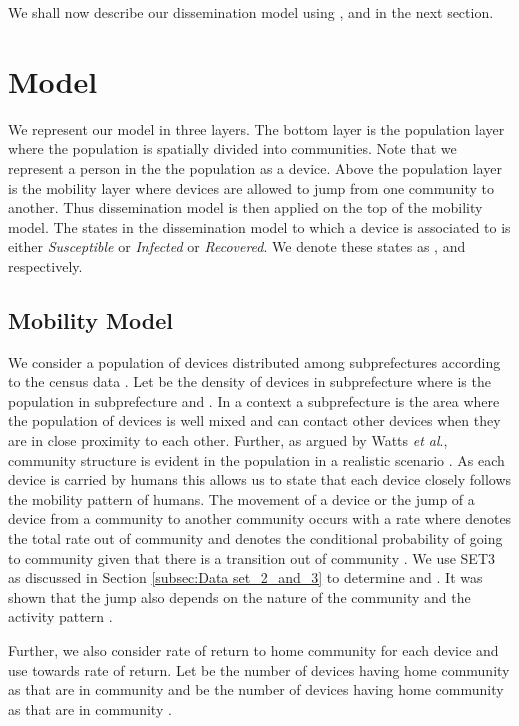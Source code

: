 \documentclass[review]{elsarticle}
\begin{document}
We shall now describe our dissemination model using ,  and  in the next section.

\section{Model}\label{sec:model}

We represent our model in three layers. The bottom layer is the population layer where the population is spatially divided into communities. Note that we represent a person in the the population as a device. Above the population layer is the mobility layer where devices are allowed to jump from one community to another. Thus dissemination model is then applied on the top of the mobility model. The states in the dissemination model to which a device is associated to is either \emph{Susceptible} or \emph{Infected} or \emph{Recovered}. We denote these states as ,  and  respectively.


\subsection{Mobility Model}\label{subsec:C3_moblitymodel}
We consider a population of  devices distributed among  subprefectures according to the census data \cite{Web1}. Let  be the density of devices in subprefecture  where  is the population in subprefecture  and . In a  context a subprefecture is the area where the population of devices is well mixed and can contact other devices when they are in close proximity to each other. Further, as argued by Watts \emph{et al}., community structure is evident in the population in a realistic scenario \cite{Watts2005}. As each device is carried by humans this allows us to state that each device closely follows the mobility pattern of humans. The movement of a device or the jump of a device from a community  to another community  occurs with a rate  where  denotes the total rate out of community  and  denotes the conditional probability of going to community  given that there is a transition out of community . We use  SET3 as discussed in Section \ref{subsec:Data set_2_and_3} to determine  and . It was shown that the jump also depends on the nature of the community \cite{Wang2012} and the activity pattern \cite{Liu2013}.

Further, we also consider rate of return to home community for each device \cite{Sattenspiel1995,Belik2011} and use  towards rate of return. Let  be the number of devices having home community as  that are in community  and  be the number of devices having home community as  that are in community .
\end{document}
